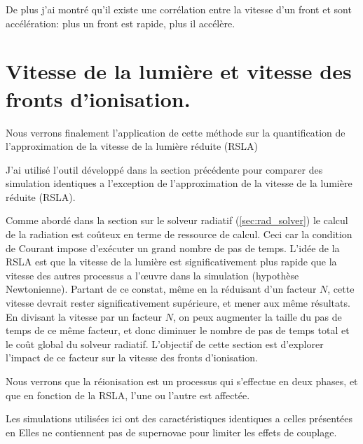 De plus j'ai montré qu'il existe une corrélation entre la vitesse d'un front et sont accélération: plus un front est rapide, plus il accélère.




\chapter{Vitesse de la lumière et vitesse des fronts d'ionisation.}
\label{sec:lightspeed}

Nous verrons finalement l’application de cette méthode sur la quantification de l’approximation de la vitesse de la lumière réduite (\ac{RSLA})


J'ai utilisé l'outil développé dans la section précédente pour comparer des simulation identiques a l'exception de l'approximation de la vitesse de la lumière réduite (\ac{RSLA}).

Comme abordé dans la section sur le solveur radiatif (\ref{sec:rad_solver}) le calcul de la radiation est coûteux en terme de ressource de calcul.
Ceci car la condition de Courant impose d'exécuter un grand nombre de pas de temps.
L'idée de la \ac{RSLA} est que la vitesse de la lumière est significativement plus rapide que la vitesse des autres processus a l’œuvre dans la simulation (hypothèse Newtonienne).
Partant de ce constat, même en la réduisant d'un facteur $N$, cette vitesse devrait rester significativement supérieure, et mener aux même résultats.
En divisant la vitesse par un facteur $N$, on peux augmenter la taille du pas de temps de ce même facteur, et donc diminuer le nombre de pas de temps total et le coût global du solveur radiatif.
L'objectif de cette section est d'explorer l'impact de ce facteur sur la vitesse des fronts d'ionisation.

Nous verrons que la réionisation est un processus qui s'effectue en deux phases, et que en fonction de la \ac{RSLA}, l'une ou l'autre est affectée.


Les simulations utilisées ici ont des caractéristiques identiques a celles présentées en %
Elles ne contiennent pas de supernovae pour limiter les effets de couplage.




